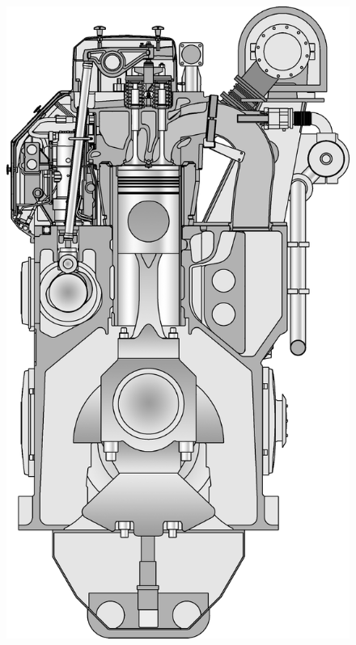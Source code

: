 \documentclass[12pt,a4paper]{article}
\begin{document}
			\begin{figure}[hbtp]
			\centering
			\includegraphics[scale=0.2]{img/8L50DF}
			\end{figure}


\vfill
~
\cleardoublepage

\flushleft
\justifying
\cleardoublepage
\pagestyle{fancy}
\end{document}
